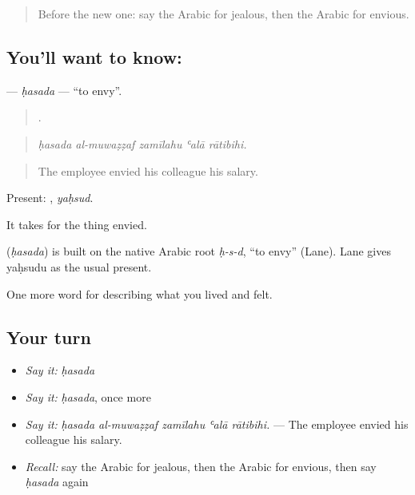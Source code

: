 \begin{quote}
Before the new one: say the Arabic for jealous, then the Arabic for envious.
\end{quote}

\subsection*{You'll want to know: }
\textbf{} — \emph{ḥasada} — \textquotedblleft{}to envy\textquotedblright{}.

\begin{quote}
    .
\end{quote}

\begin{quote}
\emph{ḥasada al-muwaẓẓaf zamīlahu ʿalā rātibihi.}
\end{quote}

\begin{quote}
The employee envied his colleague his salary.
\end{quote}

Present: , \emph{yaḥsud}.

It takes  for the thing envied.

\begin{cousinweb}
\textbf{} (\emph{ḥasada}) is built on the native Arabic root \emph{ḥ-s-d}, \textquotedblleft{}to envy\textquotedblright{} (Lane). Lane gives yaḥsudu as the usual present.
\end{cousinweb}

\begin{grammarlens}[title={What you've built}]
One more word for describing what you lived and felt.
\end{grammarlens}

\subsection*{Your turn}
\begin{itemize}
\raggedright
  \item \emph{Say it:} \emph{ḥasada}
  \item \emph{Say it:} \emph{ḥasada}, once more
  \item \emph{Say it:} \emph{ḥasada al-muwaẓẓaf zamīlahu ʿalā rātibihi.} — The employee envied his colleague his salary.
  \item \emph{Recall:} say the Arabic for jealous, then the Arabic for envious, then say \emph{ḥasada} again
\end{itemize}

